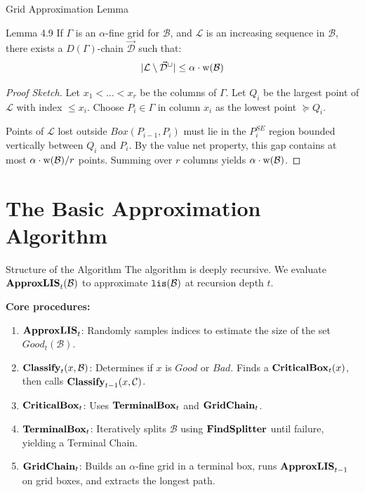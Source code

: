 \documentclass[11pt,aspectratio=169]{beamer}
\newcommand{\lis}{{\tt lis}}
\newcommand{\bx}{Box}
\newcommand{\terminalbox}{{\rm{\bf TerminalBox}}}
\newcommand{\width}{{\bf {\rm  w}}}
\newcommand{\classify}{{\rm {\bf Classify}}}
\newcommand{\approxlis}{{\rm {\bf ApproxLIS}}}
\newcommand{\critbox}{{\rm {\bf CriticalBox}}}
\newcommand{\findsplitter}{{\rm {\bf FindSplitter}}}
\newcommand{\gridchain}{{\rm {\bf GridChain}}}
\begin{document}
\begin{frame}{Grid Approximation Lemma}
    \begin{block}{Lemma 4.9}
        If $\Gamma$ is an $\alpha$-fine grid for $\mathcal{B}$, and $\mathcal{L}$ is an increasing sequence in $\mathcal{B}$, there exists a $D(\Gamma)$-chain $\vec{\mathcal{D}}$ such that:
        $$|\mathcal{L} \setminus \vec{\mathcal{D}}^\cup| \leq \alpha \cdot \width(\mathcal{B})$$
    \end{block}
    
    \begin{proof}[Proof Sketch]
        Let $x_1 < \dots < x_r$ be the columns of $\Gamma$. Let $Q_i$ be the largest point of $\mathcal{L}$ with index $\leq x_i$. Choose $P_i \in \Gamma$ in column $x_i$ as the lowest point $\succeq Q_i$. 
        
        Points of $\mathcal{L}$ lost outside $\bx(P_{i-1}, P_i)$ must lie in the $P_i^{SE}$ region bounded vertically between $Q_i$ and $P_i$. By the value net property, this gap contains at most $\alpha \cdot \width(\mathcal{B}) / r$ points. Summing over $r$ columns yields $\alpha \cdot \width(\mathcal{B})$.
    \end{proof}
\end{frame}

\section{The Basic Approximation Algorithm}

\begin{frame}{Structure of the Algorithm}
    The algorithm is deeply recursive. We evaluate $\approxlis_t(\mathcal{B})$ to approximate $\lis(\mathcal{B})$ at recursion depth $t$.
    
    \textbf{Core procedures:}
    \begin{enumerate}
        \item $\approxlis_t$: Randomly samples indices to estimate the size of the set $Good_t(\mathcal{B})$.
        \item $\classify_t(x, \mathcal{B})$: Determines if $x$ is $Good$ or $Bad$. Finds a $\critbox_t(x)$, then calls $\classify_{t-1}(x, \mathcal{C})$.
        \item $\critbox_t$: Uses $\terminalbox_t$ and $\gridchain_t$.
        \item $\terminalbox_t$: Iteratively splits $\mathcal{B}$ using $\findsplitter$ until failure, yielding a Terminal Chain.
        \item $\gridchain_t$: Builds an $\alpha$-fine grid in a terminal box, runs $\approxlis_{t-1}$ on grid boxes, and extracts the longest path.
    \end{enumerate}
\end{frame}
\end{document}

